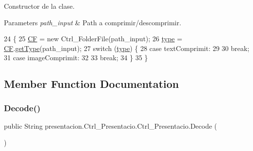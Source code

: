 Constructor de la clase. 


\begin{DoxyParams}{Parameters}
{\em path\+\_\+input} & Path a comprimir/descomprimir. \\
\hline
\end{DoxyParams}

\begin{DoxyCode}
24                                                \{
25         \hyperlink{classpresentacion_1_1Ctrl__Presentacio_1_1Ctrl__Presentacio_af46ef2ef420276ff830c2f0ff8c1a7e6}{CF} = \textcolor{keyword}{new} Ctrl\_FolderFile(path\_input);
26         \hyperlink{classpresentacion_1_1Ctrl__Presentacio_1_1Ctrl__Presentacio_af72267ee1302df6b5982c3248d5a19b0}{type} = \hyperlink{classpresentacion_1_1Ctrl__Presentacio_1_1Ctrl__Presentacio_af46ef2ef420276ff830c2f0ff8c1a7e6}{CF}.\hyperlink{classdomini_1_1folders_1_1Ctrl__FolderFile_a9e2ef751bdcb99083831c6b4e4761169}{getType}(path\_input);
27         \textcolor{keywordflow}{switch} (\hyperlink{classpresentacion_1_1Ctrl__Presentacio_1_1Ctrl__Presentacio_af72267ee1302df6b5982c3248d5a19b0}{type}) \{
28             \textcolor{keywordflow}{case} textComprimit:
29 
30                 \textcolor{keywordflow}{break};
31             \textcolor{keywordflow}{case} imageComprimit:
32 
33                 \textcolor{keywordflow}{break};
34         \}
35     \}
\end{DoxyCode}


\subsection{Member Function Documentation}
\mbox{\label{classpresentacion_1_1Ctrl__Presentacio_1_1Ctrl__Presentacio_adc652f63ed7619207a94a3a58b6bdd77}} 
\subsubsection{\texorpdfstring{Decode()}{Decode()}}
{\footnotesize\ttfamily public String presentacion.\+Ctrl\+\_\+\+Presentacio.\+Ctrl\+\_\+\+Presentacio.\+Decode (\begin{DoxyParamCaption}{ }\end{DoxyParamCaption})\hspace{0.3cm}{\ttfamily [inline]}}



